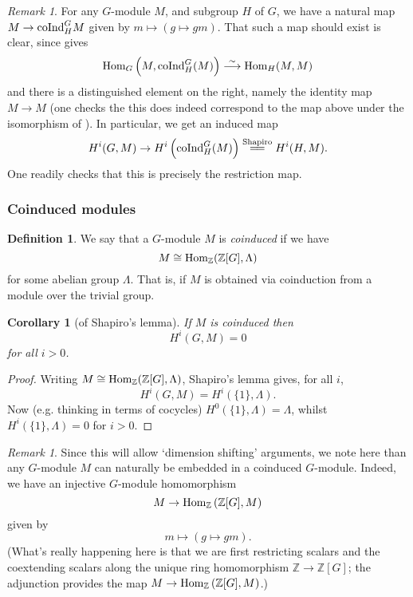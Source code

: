 \documentclass[11pt]{amsart}
\numberwithin{equation}{section}
\newtheorem{cor}[equation]{Corollary}
\theoremstyle{remark}
\newtheorem{remark}[equation]{Remark}
\theoremstyle{remark}
\theoremstyle{remark}
\theoremstyle{definition}
\theoremstyle{definition}
\theoremstyle{definition}
\newtheorem{defi}[equation]{Definition}
\theoremstyle{definition}
\theoremstyle{definition}
\theoremstyle{definition}
\begin{document}
\begin{remark} \label{res construction 2}
For any $G$-module $M$, and subgroup $H$ of $G$, we have a natural map $M\rightarrow \textup{coInd}_H^GM$ given by $m\mapsto(g\mapsto gm)$. That such a map should exist is clear, since  gives 
\[\textup{Hom}_G\left(M,\textup{coInd}_{H}^G(M)\right)\stackrel{\sim}{\longrightarrow}\textup{Hom}_H(M,M) \]
and there is a distinguished element on the right, namely the identity map $M\rightarrow M$ (one checks the this does indeed correspond to the map above under the isomorphism of ). In particular, we get an induced map
\[H^i(G,M)\rightarrow H^i\left(\textup{coInd}_{H}^G(M)\right)\stackrel{\textup{Shapiro}}{=\joinrel=}H^i(H,M).\]
One readily checks that this is precisely the restriction map.
\end{remark}

\subsubsection{Coinduced modules}

\begin{defi}
We say that a $G$-module $M$ is \textit{coinduced} if we have 
\[M\cong \textup{Hom}_{\mathbb{Z}}(\mathbb{Z}[G],\Lambda)\]
for some abelian group $\Lambda$. That is, if $M$ is obtained via coinduction from a module over the trivial group. 
\end{defi}

\begin{cor}[of Shapiro's lemma] \label{coinduced is zero}
If $M$ is coinduced then
\[H^i(G,M)=0\]
for all $i>0$.
\end{cor}

\begin{proof}
Writing $M\cong\textup{Hom}_{\mathbb{Z}}(\mathbb{Z}[G],\Lambda)$, Shapiro's lemma gives, for all $i$,
\[H^i(G,M)=H^i(\{1\},\Lambda).\]
Now (e.g. thinking in terms of cocycles) $H^0(\{1\},\Lambda)=\Lambda$, whilst $H^i(\{1\},\Lambda)=0$ for $i>0$.
\end{proof}

\begin{remark} \label{embeds in coinduced}
Since this will allow `dimension shifting' arguments, we note here than any $G$-module $M$ can naturally be embedded in a coinduced $G$-module. Indeed, we have an injective $G$-module homomorphism \[M\rightarrow \textup{Hom}_\mathbb{Z}\left(\mathbb{Z}[G],M\right)\] given by
\[m\mapsto (g\mapsto gm).\]
(What's really happening here is that we are first restricting scalars and the coextending scalars along the unique ring homomorphism $\mathbb{Z}\rightarrow \mathbb{Z}[G]$; the adjunction provides the map $M\rightarrow  \textup{Hom}_\mathbb{Z}\left(\mathbb{Z}[G],M\right)$.)
\end{remark}
\end{document}
